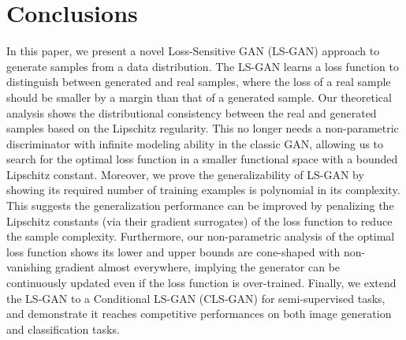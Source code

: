 \section{Conclusions}\label{sec:concl}
In this paper, we present a novel Loss-Sensitive GAN (LS-GAN) approach to generate samples from a data distribution.  The LS-GAN learns a loss function to distinguish between generated and real samples, where the loss of a real sample should be smaller by a margin than that of a generated sample.
Our theoretical analysis shows the distributional consistency between the real and generated samples based on the Lipschitz regularity.
This no longer needs a non-parametric discriminator with infinite modeling ability in the classic GAN, allowing us to search for the optimal loss function in a smaller functional space with a bounded Lipschitz constant.
Moreover, we prove the generalizability of LS-GAN by showing its required number of training examples is polynomial in its complexity. This suggests the generalization performance can be improved by penalizing the Lipschitz constants (via their gradient surrogates) of the loss function to reduce the sample complexity.
Furthermore, our non-parametric analysis of the optimal loss function shows its lower and upper bounds are cone-shaped with non-vanishing gradient almost everywhere, implying the generator can be continuously updated even if the loss function is over-trained.
Finally, we extend the LS-GAN to a Conditional LS-GAN (CLS-GAN) for semi-supervised tasks, and demonstrate it reaches competitive performances on both image generation and classification tasks.






